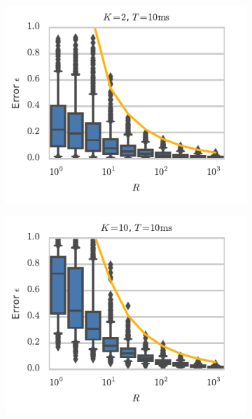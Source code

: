 \begin{figure}[t!]
\begin{subfigure}[b]{2.75in}
 \end{subfigure}
 \\
 \vspace{-.25in}
 \begin{subfigure}[b]{2.75in}
   \centering
   \includegraphics[width=\textwidth]{figures/ch9/error_vs_R_K2}
   \label{fig:error_vs_R_K2}
 \end{subfigure}
 \begin{subfigure}[b]{2.75in}
   \centering
   \includegraphics[width=\textwidth]{figures/ch9/error_vs_R_K10}
   \label{fig:error_vs_R_K10}

\end{subfigure}
\end{figure}
